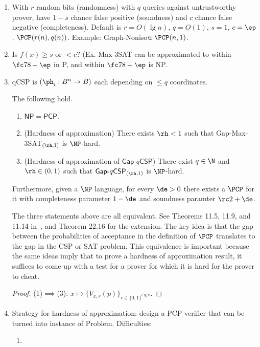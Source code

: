\begin{enumerate}
\item With $r$ random bits (randomness) with $q$ queries against untrustworthy prover, have $1-s$ chance false positive (soundness) and $c$ chance false negative (completeness). Default is $r=O(\lg n)$, $q=O(1)$, $s=1$, $c=\ep$. $\PCP(r(n),q(n))$. Example: Graph-Noniso$\in \PCP(n,1)$.
\item Is $f(x)\ge s$ or $<c$? (Ex. Max-3SAT can be approximated to within $\fc 78-\ep$ in P, and within $\fc 78+\ep$ is NP.
\item qCSP is $(\ph_i:B^n\to B)$ each depending on $\le q$ coordinates. 
\begin{thm}\label{thm:pcp}
The following hold.
\begin{enumerate}
\item
$\mathsf{NP}=\mathsf{PCP}$.
\item
(Hardness of approximation) 
There exists $\rh<1$ such that {\sf Gap-Max-3SAT}${}_{(\rh,1)}$ is $\NP$-hard.
\item
(Hardness of approximation of $\mathsf{Gap}\text{-}q\mathsf{CSP}$) There exist $q\in \N$ and $\rh\in (0,1)$ such that $\mathsf{Gap}\text{-}q\mathsf{CSP}_{(\rh,1)}$ is $\NP$-hard.
\end{enumerate}
Furthermore, given a $\NP$ language, for every $\de>0$ there exists a $\PCP$ for it with completeness parameter $1-\de$ and soundness paramter $\rc2+\de$.
\end{thm}
The three statements above are all equivalent. See Theorems 11.5, 11.9, and 11.14 in~\cite{AB09}, and Theorem 22.16 for the extension. The key idea is that the gap between the probabilities of acceptance in the definition of $\PCP$ translates to the gap in the {\sf CSP} or {\sf SAT} problem. This equivalence is important because the same ideas imply that to prove a hardness of approximation result, it suffices to come up with a test for a prover for which it is hard for the prover to cheat.
\begin{proof}
(1)$\implies$(3): $x\mapsto \{V_{x,r}(p)\}_{r\in \{0,1\}^{c\lg n}}$.
\end{proof}
\item
Strategy for hardness of approximation: design a PCP-verifier that can be turned into instance of Problem. Difficulties: 
\begin{enumerate}
\item

\end{enumerate}
\end{enumerate}
